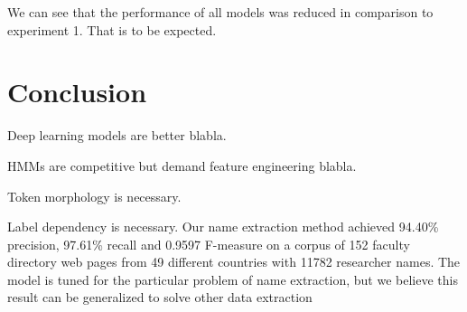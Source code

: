 \documentclass[sigconf]{acmart}
\begin{document}
We can see that the performance of all models was reduced in comparison 
to experiment 1. That is to be expected.

\section{Conclusion}

Deep learning models are better blabla.

HMMs are competitive but demand feature engineering blabla.

Token morphology is necessary.

Label dependency is necessary.
Our name extraction method achieved 94.40\% precision, 97.61\% recall 
and 0.9597 F-measure on a corpus of 152 faculty directory web pages from
49 different countries with 11782 researcher names. 
The model is tuned for the particular problem of name extraction, 
but we believe this result can be generalized to solve other data extraction 
\end{document}
